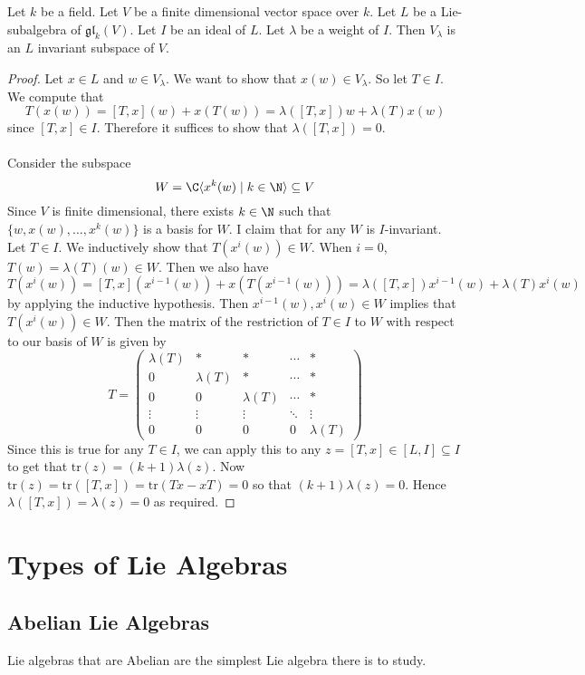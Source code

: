 \documentclass[a4paper]{article}
\begin{document}
\begin{prp}{}{} Let $k$ be a field. Let $V$ be a finite dimensional vector space over $k$. Let $L$ be a Lie-subalgebra of $\mathfrak{gl}_k(V)$. Let $I$ be an ideal of $L$. Let $\lambda$ be a weight of $I$. Then $V_\lambda$ is an $L$ invariant subspace of $V$. \tcbline
\begin{proof}
Let $x\in L$ and $w\in V_\lambda$. We want to show that $x(w)\in V_\lambda$. So let $T\in I$. We compute that $$T(x(w))=[T,x](w)+x(T(w))=\lambda([T,x])w+\lambda(T)x(w)$$ since $[T,x]\in I$. Therefore it suffices to show that $\lambda([T,x])=0$. \\~\\

Consider the subspace $$W=\C\langle x^k(w)\;|\;k\in\N\rangle\subseteq V$$ Since $V$ is finite dimensional, there exists $k\in\N$ such that $\{w,x(w),\dots,x^k(w)\}$ is a basis for $W$. I claim that for any $W$ is $I$-invariant. Let $T\in I$. We inductively show that $T(x^i(w))\in W$. When $i=0$, $T(w)=\lambda(T)(w)\in W$. Then we also have $$T(x^i(w))=[T,x](x^{i-1}(w))+x(T(x^{i-1}(w)))=\lambda([T,x])x^{i-1}(w)+\lambda(T)x^i(w)$$ by applying the inductive hypothesis. Then $x^{i-1}(w),x^i(w)\in W$ implies that $T(x^i(w))\in W$. Then the matrix of the restriction of $T\in I$ to $W$ with respect to our basis of $W$ is given by $$T=\begin{pmatrix}
\lambda(T) & \ast & \ast & \cdots & \ast\\
0 & \lambda(T) & \ast & \cdots & \ast\\
0 & 0 & \lambda(T) & \cdots & \ast\\
\vdots & \vdots & \vdots & \ddots & \vdots\\
0 & 0 & 0 & 0 & \lambda(T)
\end{pmatrix}$$
Since this is true for any $T\in I$, we can apply this to any $z=[T,x]\in [L,I]\subseteq I$ to get that $\text{tr}(z)=(k+1)\lambda(z)$. Now $\text{tr}(z)=\text{tr}([T,x])=\text{tr}(Tx-xT)=0$ so that $(k+1)\lambda(z)=0$. Hence $\lambda([T,x])=\lambda(z)=0$ as required. 
\end{proof}
\end{prp}

\pagebreak
\section{Types of Lie Algebras}
\subsection{Abelian Lie Algebras}
Lie algebras that are Abelian are the simplest Lie algebra there is to study. 
\end{document}
